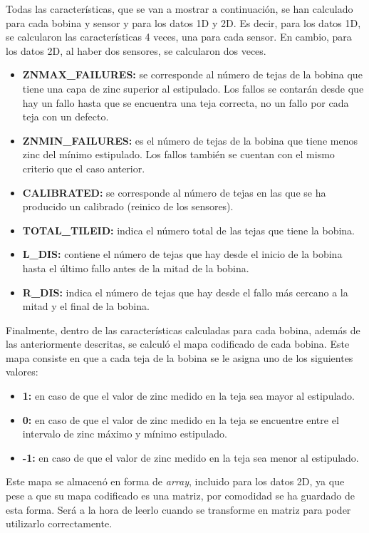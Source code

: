 Todas las características, que se van a mostrar a continuación, se han calculado para cada bobina y sensor y para los datos 1D y 2D. Es decir, para los datos 1D, se calcularon las características 4 veces, una para cada sensor. En cambio, para los datos 2D, al haber dos sensores, se calcularon dos veces.
\begin{itemize}
    \item \textbf{ZNMAX\_FAILURES:} se corresponde al número de tejas de la bobina que tiene una capa de zinc superior al estipulado. Los fallos se contarán desde que hay un fallo hasta que se encuentra una teja correcta, no un fallo por cada teja con un defecto.
    \item \textbf{ZNMIN\_FAILURES:} es el número de tejas de la bobina que tiene menos zinc del mínimo estipulado. Los fallos también se cuentan con el mismo criterio que el caso anterior.
    \item \textbf{CALIBRATED:} se corresponde al número de tejas en las que se ha producido un calibrado (reinico de los sensores).
    \item \textbf{TOTAL\_TILEID:} indica el número total de las tejas que tiene la bobina.
    \item \textbf{L\_DIS:} contiene el número de tejas que hay desde el inicio de la bobina hasta el último fallo antes de la mitad de la bobina.
    \item \textbf{R\_DIS:} indica el número de tejas que hay desde el fallo más cercano a la mitad y el final de la bobina.
\end{itemize}

Finalmente, dentro de las características calculadas para cada bobina, además de las anteriormente descritas, se calculó el mapa codificado de cada bobina. Este mapa consiste en que a cada teja de la bobina se le asigna uno de los siguientes valores:
\begin{itemize}
    \item \textbf{1:} en caso de que el valor de zinc medido en la teja sea mayor al estipulado.
    \item \textbf{0:} en caso de que el valor de zinc medido en la teja se encuentre entre el intervalo de zinc máximo y mínimo estipulado.
    \item \textbf{-1:} en caso de que el valor de zinc medido en la teja sea menor al estipulado.
\end{itemize}

Este mapa se almacenó en forma de \emph{array}, incluido para los datos 2D, ya que pese a que su mapa codificado es una matriz, por comodidad se ha guardado de esta forma. Será a la hora de leerlo cuando se transforme en matriz para poder utilizarlo correctamente.

